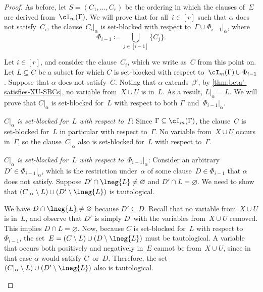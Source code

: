\documentclass[12pt]{article}
\begin{document}
\begin{proof}
  As before, let $S = (C_1, \dots, C_r)$ be the ordering in which
  the clauses of~$\Sigma$ are derived from~$\cI_m(\Gamma)$.
  We will prove that for all~$i \in [r]$
  such that $\alpha$ does not satisfy~$C_i$,
  the clause~$C_i|_\alpha$ is set-blocked
  with respect to~$\Gamma \cup \Phi_{i - 1}|_\alpha$, where
  \begin{equation*}
    \Phi_{i - 1} \coloneqq \bigcup_{j \in [i - 1]} \{C_j\}.
  \end{equation*}

  Let $i \in [r]$, and consider the clause~$C_i$,
  which we write as~$C$ from this point on.
  Let $L \subseteq C$ be a subset for which $C$ is set-blocked
  with respect to~$\cI_m(\Gamma) \cup \Phi_{i - 1}$.
  Suppose that $\alpha$ does not satisfy~$C$.
  Noting that $\alpha$ extends~$\beta'$,
  by \cref{thm:beta'-satisfies-XU-SBCs},
  no variable from~$X \cup U$ is in~$L$.
  As a result, $L|_\alpha = L$.
  We will prove that $C|_\alpha$ is set-blocked for~$L$
  with respect to both $\Gamma$~and~$\Phi_{i - 1}|_\alpha$.

  \begin{description}
  \item\hspace{-\labelsep}\ignorespaces
    \textit{$C|_\alpha$ is set-blocked
      for~$L$ with respect to~$\Gamma$}:
    Since $\Gamma \subseteq \cI_m(\Gamma)$, the clause~$C$
    is set-blocked for~$L$ in particular with respect to~$\Gamma$.
    No variable from~$X \cup U$ occurs in~$\Gamma$,
    so the clause~$C|_\alpha$ also is set-blocked
    for~$L$ with respect to~$\Gamma$.
  \item\hspace{-\labelsep}\ignorespaces
    \textit{$C|_\alpha$ is set-blocked
      for~$L$ with respect to~$\Phi_{i - 1}|_\alpha$}:
    Consider an arbitrary~$D' \in \Phi_{i - 1}|_\alpha$,
    which is the restriction under~$\alpha$
    of some clause~$D \in \Phi_{i - 1}$ that $\alpha$ does not satisfy.
    Suppose $D' \cap \lneg{L} \neq \varnothing$ and $D' \cap L = \varnothing$.
    We need to show that $(C|_\alpha \setminus L)
    \cup (D' \setminus \lneg{L})$ is tautological.

    We have $D \cap \lneg{L} \neq \varnothing$ because $D' \subseteq D$.
    Recall that no variable from~$X \cup U$ is in~$L$,
    and observe that $D'$ is simply $D$~with the variables from~$X \cup U$ removed.
    This implies $D \cap L = \varnothing$.
    Now, because $C$ is set-blocked for~$L$ with respect to~$\Phi_{i - 1}$,
    the set~$E = (C \setminus L) \cup (D \setminus \lneg{L})$ must be tautological.
    A variable that occurs both positively and negatively in~$E$
    cannot be from~$X \cup U$, since in that case $\alpha$ would satisfy $C$~or~$D$.
    Therefore, the set~$(C|_\alpha \setminus L)
    \cup (D' \setminus \lneg{L})$ also is tautological. \qedhere
  \end{description}
\end{proof}
\end{document}
